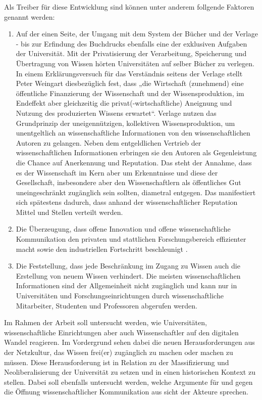 Als Treiber für diese Entwicklung sind können unter anderem follgende Faktoren genannt werden: 
\begin{enumerate}
\item Auf der einen Seite, der Umgang mit dem System der Bücher und der Verlage - bis zur Erfindung des Buchdrucks ebenfalls eine der exklusiven Aufgaben der Universität. Mit der Privatisierung der Verarbeitung, Speicherung und Übertragung von Wissen hörten Universitäten auf selber Bücher zu verlegen. In einem Erklärungsversuch für das Verständnis seitens der Verlage stellt Peter Weingart diesbezüglich fest, dass „die Wirtschaft (zunehmend) eine öffentliche Finanzierung der Wissenschaft und der Wissensproduktion, im Endeffekt aber gleichzeitig die privat(-wirtschaftliche) Aneignung und Nutzung des produzierten Wissens erwartet“\cite{cite:2}. Verlage nutzen das Grundprinzip der uneigennützigen, kollektiven Wissensproduktion, um unentgeltlich an wissenschaftliche Informationen von den wissenschaftlichen Autoren zu gelangen. Neben dem entgeldlichen Vertrieb der wissenschaftlichen Informationen erbringen sie den Autoren als Gegenleistung die Chance auf Anerkennung und Reputation. Das steht der Annahme, dass es der Wissenschaft im Kern aber um Erkenntnisse und diese der Gesellschaft, insbesondere aber den Wissenschaftlern als öffentliches Gut uneingeschränkt zugänglich sein sollten\cite{hanekop_2006}, diametral entgegen. Das manifestiert sich spätestens dadurch, dass anhand der wissenschaftlicher Reputation Mittel und Stellen verteilt werden\cite{cite:4}.
\item Die Überzeugung, dass offene Innovation und offene wissenschaftliche Kommunikation den privaten und stattlichen Forschungsbereich effizienter macht sowie den industriellen Fortschritt beschleunigt \cite{cite:7}.
\item Die Feststellung, dass jede Beschränkung im Zugang zu Wissen auch die Erstellung von neuem Wissen verhindert\cite{cite:5}\cite{cite:8}.  Die meisten wissenschaftlichen Informationen sind der Allgemeinheit nicht zugänglich und kann nur in Universitäten und Forschungseinrichtungen durch wissenschaftliche Mitarbeiter, Studenten und Professoren abgerufen werden\cite{cite:6}. 
\end{enumerate}	

Im Rahmen der Arbeit soll untersucht werden, wie Universitäten, wissenschaftliche Einrichtungen aber auch Wissenschaftler auf den digitalen Wandel reagieren. Im Vordergrund sehen dabei die neuen Herausforderungen aus der Netzkultur, das Wissen frei(er) zugänglich zu machen oder machen zu müssen. Diese Herausforderung ist in Relation zu der Massifizierung und Neoliberalisierung der Universität zu setzen und in einen historischen Kontext zu stellen. Dabei soll ebenfalls untersucht werden, welche Argumente für und gegen die Öffnung wissenschaftlicher Kommunikation aus sicht der Akteure sprechen.

